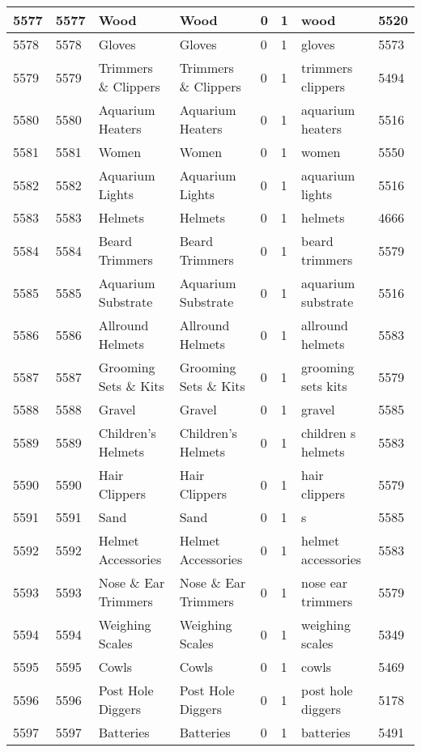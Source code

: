 \begin{longtable}{|l|l|l|l|l|l|l|l|}
5577 & 5577 & Wood & Wood & 0 & 1 & wood & 5520 \\ \hline 
5578 & 5578 & Gloves & Gloves & 0 & 1 & gloves & 5573 \\ \hline 
5579 & 5579 & Trimmers \& Clippers & Trimmers \& Clippers & 0 & 1 & trimmers clippers & 5494 \\ \hline 
5580 & 5580 & Aquarium Heaters & Aquarium Heaters & 0 & 1 & aquarium heaters & 5516 \\ \hline 
5581 & 5581 & Women & Women & 0 & 1 & women & 5550 \\ \hline 
5582 & 5582 & Aquarium Lights & Aquarium Lights & 0 & 1 & aquarium lights & 5516 \\ \hline 
5583 & 5583 & Helmets & Helmets & 0 & 1 & helmets & 4666 \\ \hline 
5584 & 5584 & Beard Trimmers & Beard Trimmers & 0 & 1 & beard trimmers & 5579 \\ \hline 
5585 & 5585 & Aquarium Substrate & Aquarium Substrate & 0 & 1 & aquarium substrate & 5516 \\ \hline 
5586 & 5586 & Allround Helmets & Allround Helmets & 0 & 1 & allround helmets & 5583 \\ \hline 
5587 & 5587 & Grooming Sets \& Kits & Grooming Sets \& Kits & 0 & 1 & grooming sets kits & 5579 \\ \hline 
5588 & 5588 & Gravel & Gravel & 0 & 1 & gravel & 5585 \\ \hline 
5589 & 5589 & Children's Helmets & Children's Helmets & 0 & 1 & children s helmets & 5583 \\ \hline 
5590 & 5590 & Hair Clippers & Hair Clippers & 0 & 1 & hair clippers & 5579 \\ \hline 
5591 & 5591 & Sand & Sand & 0 & 1 & s  & 5585 \\ \hline 
5592 & 5592 & Helmet Accessories & Helmet Accessories & 0 & 1 & helmet accessories & 5583 \\ \hline 
5593 & 5593 & Nose \& Ear Trimmers & Nose \& Ear Trimmers & 0 & 1 & nose ear trimmers & 5579 \\ \hline 
5594 & 5594 & Weighing Scales & Weighing Scales & 0 & 1 & weighing scales & 5349 \\ \hline 
5595 & 5595 & Cowls & Cowls & 0 & 1 & cowls & 5469 \\ \hline 
5596 & 5596 & Post Hole Diggers & Post Hole Diggers & 0 & 1 & post hole diggers & 5178 \\ \hline 
5597 & 5597 & Batteries & Batteries & 0 & 1 & batteries & 5491 \\ \hline 

\end{longtable}
